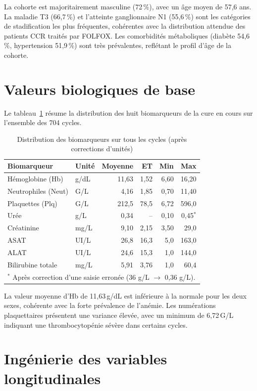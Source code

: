 \documentclass[12pt,a4paper]{report}
\begin{document}
La cohorte est majoritairement masculine (72\,\%), avec un âge moyen de 57,6 ans. La maladie T3 (66,7\,\%) et l'atteinte ganglionnaire N1 (55,6\,\%) sont les catégories de stadification les plus fréquentes, cohérentes avec la distribution attendue des patients CCR traités par FOLFOX. Les comorbidités métaboliques (diabète 54,6\,\%, hypertension 51,9\,\%) sont très prévalentes, reflétant le profil d'âge de la cohorte.

\section{Valeurs biologiques de base}

Le tableau~\ref{tab:bio} résume la distribution des huit biomarqueurs de la cure en cours sur l'ensemble des 704 cycles.

\begin{table}[H]
\centering
\caption{Distribution des biomarqueurs sur tous les cycles (après corrections d'unités)}
\label{tab:bio}
\begin{tabular}{llrrrr}
\toprule
\textbf{Biomarqueur} & \textbf{Unité} & \textbf{Moyenne} & \textbf{ET} & \textbf{Min} & \textbf{Max} \\
\midrule
Hémoglobine (Hb) & g/dL & 11,63 & 1,52 & 6,60 & 16,20 \\
Neutrophiles (Neut) & G/L & 4,16 & 1,85 & 0,70 & 11,40 \\
Plaquettes (Plq) & G/L & 212,5 & 78,5 & 6,72 & 596,0 \\
Urée & g/L & 0,34 & -- & 0,10 & 0,45$^{*}$ \\
Créatinine & mg/L & 9,10 & 2,15 & 3,50 & 29,0 \\
ASAT & UI/L & 26,8 & 16,3 & 5,0 & 163,0 \\
ALAT & UI/L & 24,6 & 15,3 & 1,0 & 144,0 \\
Bilirubine totale & mg/L & 5,91 & 3,76 & 1,0 & 60,4 \\
\bottomrule
\multicolumn{6}{l}{\small $^{*}$ Après correction d'une saisie erronée (36 g/L $\to$ 0,36 g/L).}
\end{tabular}
\end{table}

La valeur moyenne d'Hb de 11,63\,g/dL est inférieure à la normale pour les deux sexes, cohérente avec la forte prévalence de l'anémie. Les numérations plaquettaires présentent une variance élevée, avec un minimum de 6,72\,G/L indiquant une thrombocytopénie sévère dans certains cycles.

\section{Ingénierie des variables longitudinales}
\label{sec:features}
\end{document}
